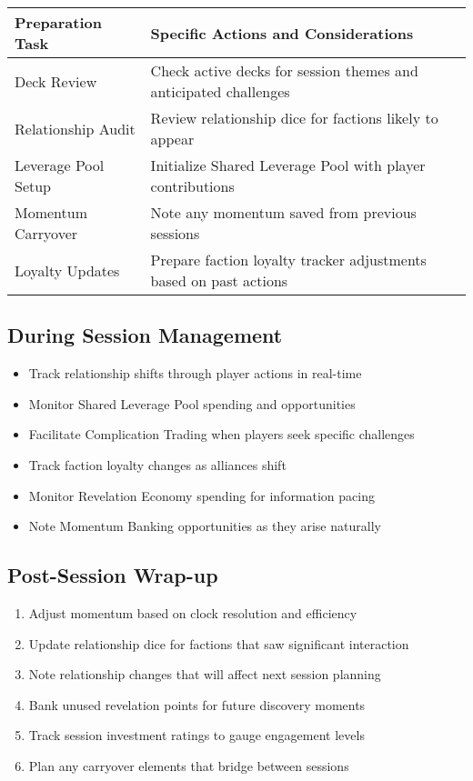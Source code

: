 \begin{fatebox}
\begin{tabularx}{\textwidth}{lX}
\toprule
\textbf{Preparation Task} & \textbf{Specific Actions and Considerations} \\
\midrule
Deck Review & Check active decks for session themes and anticipated challenges \\
Relationship Audit & Review relationship dice for factions likely to appear \\
Leverage Pool Setup & Initialize Shared Leverage Pool with player contributions \\
Momentum Carryover & Note any momentum saved from previous sessions \\
Loyalty Updates & Prepare faction loyalty tracker adjustments based on past actions \\
\bottomrule
\end{tabularx}
\end{fatebox}

\subsection*{During Session Management}

\begin{itemize}
    \item Track relationship shifts through player actions in real-time
    \item Monitor Shared Leverage Pool spending and opportunities
    \item Facilitate Complication Trading when players seek specific challenges
    \item Track faction loyalty changes as alliances shift
    \item Monitor Revelation Economy spending for information pacing
    \item Note Momentum Banking opportunities as they arise naturally
\end{itemize}

\subsection*{Post-Session Wrap-up}

\begin{enumerate}
    \item Adjust momentum based on clock resolution and efficiency
    \item Update relationship dice for factions that saw significant interaction
    \item Note relationship changes that will affect next session planning
    \item Bank unused revelation points for future discovery moments
    \item Track session investment ratings to gauge engagement levels
    \item Plan any carryover elements that bridge between sessions
\end{enumerate}

